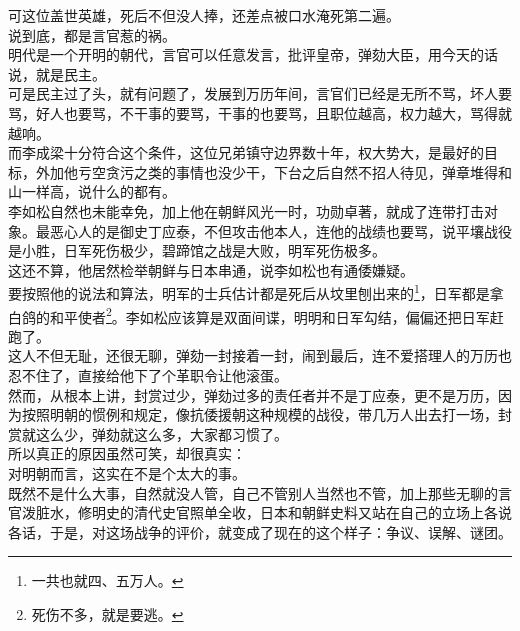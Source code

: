 \begin{multicols}{\theparacolNo}
可这位盖世英雄，死后不但没人捧，还差点被口水淹死第二遍。\\

说到底，都是言官惹的祸。\\

明代是一个开明的朝代，言官可以任意发言，批评皇帝，弹劾大臣，用今天的话说，就是民主。\\

可是民主过了头，就有问题了，发展到万历年间，言官们已经是无所不骂，坏人要骂，好人也要骂，不干事的要骂，干事的也要骂，且职位越高，权力越大，骂得就越响。\\

而李成梁十分符合这个条件，这位兄弟镇守边界数十年，权大势大，是最好的目标，外加他亏空贪污之类的事情也没少干，下台之后自然不招人待见，弹章堆得和山一样高，说什么的都有。\\

李如松自然也未能幸免，加上他在朝鲜风光一时，功勋卓著，就成了连带打击对象。最恶心人的是御史丁应泰，不但攻击他本人，连他的战绩也要骂，说平壤战役是小胜，日军死伤极少，碧蹄馆之战是大败，明军死伤极多。\\

这还不算，他居然检举朝鲜与日本串通，说李如松也有通倭嫌疑。\\

要按照他的说法和算法，明军的士兵估计都是死后从坟里刨出来的\footnote{一共也就四、五万人。}，日军都是拿白鸽的和平使者\footnote{死伤不多，就是要逃。}。李如松应该算是双面间谍，明明和日军勾结，偏偏还把日军赶跑了。\\

这人不但无耻，还很无聊，弹劾一封接着一封，闹到最后，连不爱搭理人的万历也忍不住了，直接给他下了个革职令让他滚蛋。\\

然而，从根本上讲，封赏过少，弹劾过多的责任者并不是丁应泰，更不是万历，因为按照明朝的惯例和规定，像抗倭援朝这种规模的战役，带几万人出去打一场，封赏就这么少，弹劾就这么多，大家都习惯了。\\

所以真正的原因虽然可笑，却很真实：\\

对明朝而言，这实在不是个太大的事。\\

既然不是什么大事，自然就没人管，自己不管别人当然也不管，加上那些无聊的言官泼脏水，修明史的清代史官照单全收，日本和朝鲜史料又站在自己的立场上各说各话，于是，对这场战争的评价，就变成了现在的这个样子：争议、误解、谜团。\\


\end{multicols}
